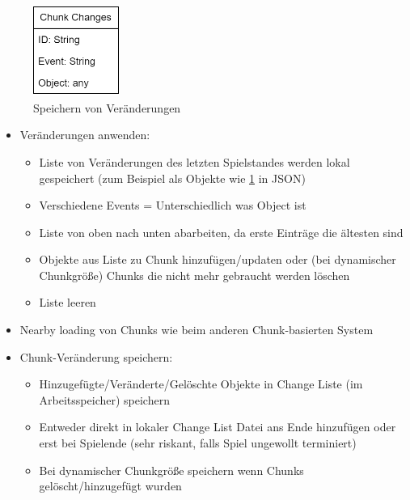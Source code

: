 \begin{figure}[htp]
    \centering
    \includegraphics[width=0.25\textwidth]{images/Changes.png}
    \caption{Speichern von Veränderungen}
    \label{fig:changesClass}
\end{figure}

\begin{itemize}
    \item Veränderungen anwenden:
    \begin{itemize}
        \item Liste von Veränderungen des letzten Spielstandes werden lokal gespeichert (zum Beispiel als Objekte wie \ref{fig:changesClass} in JSON)
        \item Verschiedene Events = Unterschiedlich was Object ist
        \item Liste von oben nach unten abarbeiten, da erste Einträge die ältesten sind 
        \item Objekte aus Liste zu Chunk hinzufügen/updaten oder (bei dynamischer Chunkgröße) Chunks die nicht mehr gebraucht werden löschen
        \item Liste leeren
    \end{itemize}
    \item Nearby loading von Chunks wie beim anderen Chunk-basierten System
    \item Chunk-Veränderung speichern:
    \begin{itemize}
        \item Hinzugefügte/Veränderte/Gelöschte Objekte in Change Liste (im Arbeitsspeicher) speichern
        \item Entweder direkt in lokaler Change List Datei ans Ende hinzufügen oder erst bei Spielende (sehr riskant, falls Spiel ungewollt terminiert)
        \item Bei dynamischer Chunkgröße speichern wenn Chunks gelöscht/hinzugefügt wurden
    \end{itemize}
\end{itemize}



